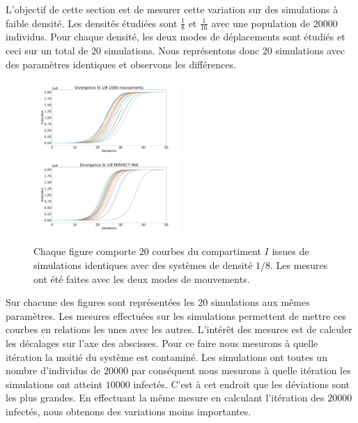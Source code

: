 L'objectif de cette section est de mesurer cette variation sur des simulations à faible densité. Les densités étudiées sont $\frac{1}{8}$ et $\frac{1}{16}$ avec une population de $20000$ individus. Pour chaque densité, les deux modes de déplacements sont étudiés et ceci sur un total de $20$ simulations. Nous représentons donc $20$ simulations avec des paramètres identiques et observons les différences.

\newpage

\begin{figure}
	\centering
	\captionsetup{justification=centering}
	\includegraphics[width=0.5\textwidth]{Images/SI_divergence_8_1000.pdf}
	\includegraphics[width=0.5\textwidth]{Images/SI_divergence_8_mix.pdf}
	\caption[Variations aléatoires : SI]{Chaque figure comporte $20$ courbes du compartiment $I$ issues de simulations identiques avec des systèmes de densité $1/8$. Les mesures ont été faites avec les deux modes de mouvements.}
\end{figure}

Sur chacune des figures sont représentées les $20$ simulations aux mêmes paramètres. Les mesures effectuées sur les simulations permettent de mettre ces courbes en relations les unes avec les autres. L'intérêt des mesures est de calculer les décalages sur l'axe des abscisses. Pour ce faire nous mesurons à quelle itération la moitié du système est contaminé. Les simulations ont toutes un nombre d'individus de $20000$ par conséquent nous mesurons à quelle itération les simulations ont atteint $10000$ infectés. C'est à cet endroit que les déviations sont les plus grandes. En effectuant la même mesure en calculant l'itération des $20000$ infectés, nous obtenons des variations moins importantes.\\

